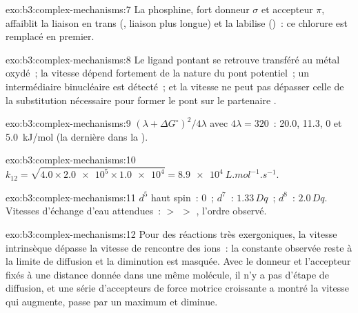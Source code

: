 \begin{solution}{exo:b3:complex-mechanisms:7}
La phosphine, fort donneur $\sigma$ et accepteur $\pi$, affaiblit la liaison en trans (, liaison plus longue) et la labilise ()~: ce chlorure est
remplacé en premier.
\end{solution}

\begin{solution}{exo:b3:complex-mechanisms:8}
Le ligand pontant se retrouve transféré au métal oxydé~; la vitesse dépend
fortement de la nature du pont potentiel~; un intermédiaire binucléaire est
détecté~; et la vitesse ne peut pas dépasser celle de la substitution
nécessaire pour former le pont sur le partenaire .
\end{solution}

\begin{solution}{exo:b3:complex-mechanisms:9}
$(\lambda + \Delta G^\circ)^2/4\lambda$ avec $4\lambda = 320$~: 20.0, 11.3, 0 et \qty{5.0}{kJ/mol} (la dernière dans la
).
\end{solution}

\begin{solution}{exo:b3:complex-mechanisms:10}
$k_{12} = \sqrt{4.0 \times \num{2.0e5} \times \num{1.0e4}} = \qty{8.9e4}{L.mol^{-1}.s^{-1}}$.
\end{solution}

\begin{solution}{exo:b3:complex-mechanisms:11}
$d^5$ haut spin~: 0~; $d^7$~: $1.33\,Dq$~; $d^8$~: $2.0\,Dq$. Vitesses d'échange d'eau attendues~:  $>$  $>$
, l'ordre observé.
\end{solution}

\begin{solution}{exo:b3:complex-mechanisms:12}
Pour des réactions très exergoniques, la vitesse intrinsèque dépasse la
vitesse de rencontre des ions~: la constante observée reste à la limite de
diffusion et la diminution est masquée. Avec le donneur et l'accepteur
fixés à une distance donnée dans une même molécule, il n'y a pas d'étape de
diffusion, et une série d'accepteurs de force motrice croissante a montré
la vitesse qui augmente, passe par un maximum et diminue.
\end{solution}

